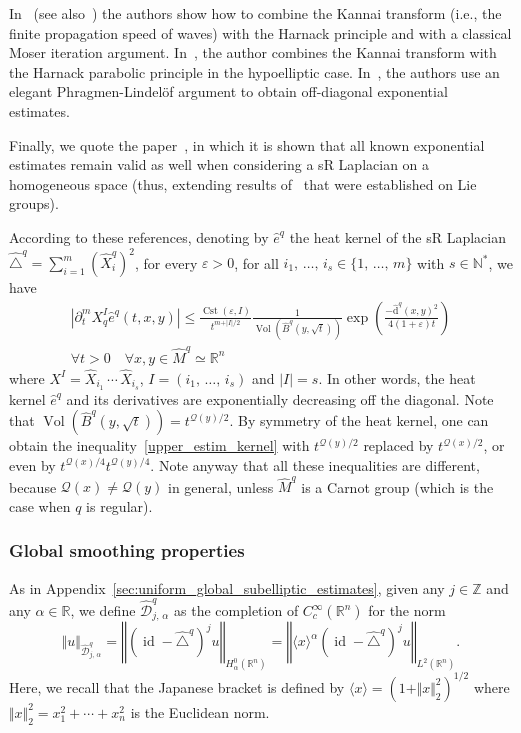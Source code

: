 \documentclass[10pt]{amsart}
\theoremstyle{definition}\newtheorem{defi}[theo]{Definition}\newtheorem{rema}[theo]{Remark}\newtheorem{exam}[theo]{Example}\newtheorem{exem}[theo]{Example}\newtheorem{nota}[theo]{Notation}
\newcommand*\R{\mathbb{R}}
\newcommand*\N{\mathbb{N}}
\newcommand*\Z{\mathbb{Z}}
\newcommand{\calQ}{\mathcal{Q}}
\newcommand{\calD}{\mathcal{D}}
\newcommand{\rmd}{\mathrm{d}}
\DeclareMathOperator{\Cst}{Cst}
\DeclareMathOperator{\id}{id}
\DeclareMathOperator{\Vol}{Vol}
\renewcommand{\leq}{\leqslant}
\let\oldforall\forall
\renewcommand*{\forall}{\mathrel{\oldforall}}
\begin{document}
In~\cite{CheegerGromovTaylor_1982} (see also~\cite{Me-84}) the authors show how to combine the Kannai transform (i.e., the finite propagation speed of waves) with the Harnack principle and with a classical Moser iteration argument. In~\cite{Saloff-Coste_IMRN1992}, the author combines the Kannai transform with the Harnack parabolic principle in the hypoelliptic case. In~\cite{CoulhonSikora_PLMS2008}, the authors use an elegant Phragmen-Lindel\"of argument to obtain off-diagonal exponential estimates.

Finally, we quote the paper~\cite{Maheux_JGA1998}, in which it is shown that all known exponential estimates remain valid as well when considering a sR Laplacian on a homogeneous space (thus, extending results of~\cite{Varopoulos} that were established on Lie groups).

According to these references, denoting by $\widehat{e}^q$ the heat kernel of the sR Laplacian $\widehat{\triangle}^q=\sum_{i=1}^m (\widehat{X}_i^q)^2$, for every $\varepsilon>0$, for all $i_1,\,\ldots,\,i_s\in\{1,\,\ldots,\,m\}$ with $s\in\N^*$, we have
\begin{multline}\label{upper_estim_kernel}
\left\vert \partial_t^m X_q^I \widehat{e}^q(t,x,y) \right\vert \leq \frac{\Cst(\varepsilon,I)}{t^{m+\vert I\vert/2}} \frac{1}{\Vol\left(\widehat{B}^q\left(y,\sqrt{t}\right)\right)} \exp \left(\frac{-\widehat{\rmd}^q(x,y)^2}{4(1+\varepsilon)t} \right) \\
\forall t>0\quad\forall x,y\in\widehat{M}^q\simeq\R^n
\end{multline}
where $X^I = \widehat{X}_{i_1}\,\cdots\,\widehat{X}_{i_s}$, $I=(i_1,\,\ldots,\,i_s)$ and $\vert I\vert=s$. In other words, the heat kernel $\widehat{e}^q$ and its derivatives are exponentially decreasing off the diagonal. Note that $\Vol(\widehat{B}^q(y,\sqrt{t}))=t^{\calQ(y)/2}$. By symmetry of the heat kernel, one can obtain the inequality~\eqref{upper_estim_kernel} with $t^{\calQ(y)/2}$ replaced by $t^{\calQ(x)/2}$, or even by $t^{\calQ(x)/4}t^{\calQ(y)/4}$. Note anyway that all these inequalities are different, because $\calQ(x)\neq \calQ(y)$ in general, unless $\widehat{M}^q$ is a Carnot group (which is the case when $q$ is regular).



\subsubsection{Global smoothing properties}
As in Appendix~\ref{sec:uniform_global_subelliptic_estimates}, given any $j\in\Z$ and any $\alpha\in\R$, we define $\widehat{\calD}^q_{j,\,\alpha}$ as the completion of $C_c^\infty(\R^n)$ for the norm
\[
\Vert u\Vert_{\widehat{\calD}^q_{j,\,\alpha}} = \left\Vert \left(\id - \widehat{\triangle}^q\right)^j u\right\Vert_{H^0_\alpha\left(\R^n\right)} = \left\Vert \langle x\rangle^\alpha\left(\id - \widehat{\triangle}^q\right)^j u\right\Vert_{L^2\left(\R^n\right)}.
\]
Here, we recall that the Japanese bracket is defined by $\langle x\rangle = (1+\Vert x\Vert_2^2)^{1/2}$ where $\Vert x\Vert_2^2=x_1^2+\cdots+x_n^2$ is the Euclidean norm.
\end{document}
